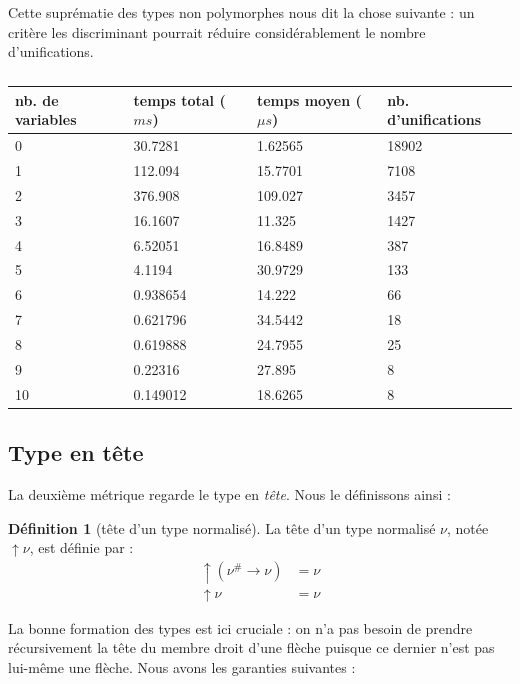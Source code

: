 \documentclass[a4paper]{report}
\theoremstyle{definition}
\newtheorem{definition}[theoreme]{Définition}
\begin{document}
Cette suprématie des types non polymorphes nous dit la chose suivante : un critère les discriminant pourrait réduire considérablement le nombre d'unifications.

\begin{table}[h]
  \centering
  \begin{tabular}{|l|l|l|l|}
    \hline
      nb. de variables &
      temps total ($ms$) &
      temps moyen ($\mu s$) &
      nb. d'unifications
    \\
    \hline
      0 & 30.7281 & 1.62565 & 18902
    \\
      1 & 112.094 & 15.7701 & 7108
    \\
      2 & 376.908 & 109.027 & 3457
    \\
      3 & 16.1607 & 11.325 & 1427
    \\
      4 & 6.52051 & 16.8489 & 387
    \\
      5 & 4.1194 & 30.9729 & 133
    \\
      6 & 0.938654 & 14.222 & 66
    \\
      7 & 0.621796 & 34.5442 & 18
    \\
      8 & 0.619888 & 24.7955 & 25
    \\
      9 & 0.22316 & 27.895 & 8
    \\
      10 & 0.149012 & 18.6265 & 8
    \\
    \hline
  \end{tabular}
  \caption{\label{tab_meas1}}
\end{table}


\subsection{Type en tête}

La deuxième métrique regarde le type en \emph{tête}. Nous le définissons ainsi :

\begin{definition}[tête d'un type normalisé]
  La tête d'un type normalisé $\nu$, notée $\uparrow \nu$, est définie par :
  \begin{align*}
      \uparrow (\nu^\# \rightarrow \nu) &=
      \nu
    \\
      \uparrow \nu &=
      \nu
  \end{align*}
\end{definition}

La bonne formation des types est ici cruciale : on n'a pas besoin de prendre récursivement la tête du membre droit d'une flèche puisque ce dernier n'est pas lui-même une flèche. Nous avons les garanties suivantes :
\end{document}
